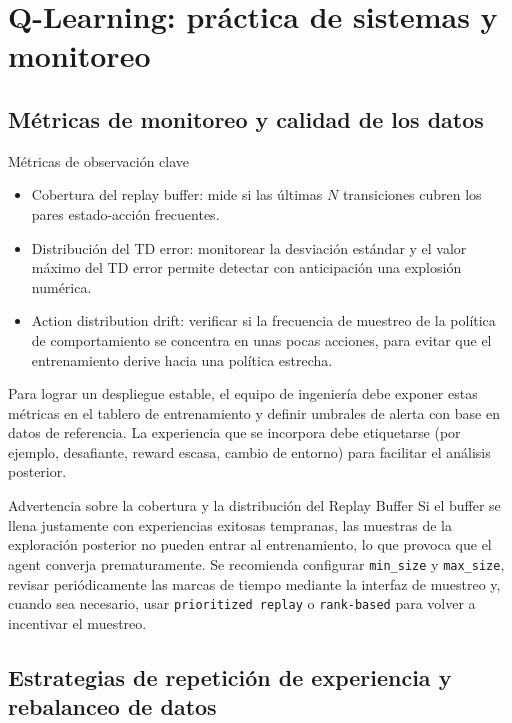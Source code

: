 \section{Q-Learning: práctica de sistemas y monitoreo}

\subsection{Métricas de monitoreo y calidad de los datos}

\begin{knowledgebox}{Métricas de observación clave}
\begin{itemize}
    \item Cobertura del replay buffer: mide si las últimas $N$ transiciones cubren los pares estado-acción frecuentes.
    \item Distribución del TD error: monitorear la desviación estándar y el valor máximo del TD error permite detectar con anticipación una explosión numérica.
    \item Action distribution drift: verificar si la frecuencia de muestreo de la política de comportamiento se concentra en unas pocas acciones, para evitar que el entrenamiento derive hacia una política estrecha.
\end{itemize}
\end{knowledgebox}

Para lograr un despliegue estable, el equipo de ingeniería debe exponer estas métricas en el tablero de entrenamiento y definir umbrales de alerta con base en datos de referencia. La experiencia que se incorpora debe etiquetarse (por ejemplo, desafiante, reward escasa, cambio de entorno) para facilitar el análisis posterior.

\begin{importantbox}{Advertencia sobre la cobertura y la distribución del Replay Buffer}
Si el buffer se llena justamente con experiencias exitosas tempranas, las muestras de la exploración posterior no pueden entrar al entrenamiento, lo que provoca que el agent converja prematuramente. Se recomienda configurar \texttt{min\_size} y \texttt{max\_size}, revisar periódicamente las marcas de tiempo mediante la interfaz de muestreo y, cuando sea necesario, usar \texttt{prioritized replay} o \texttt{rank-based} para volver a incentivar el muestreo.
\end{importantbox}

\subsection{Estrategias de repetición de experiencia y rebalanceo de datos}

